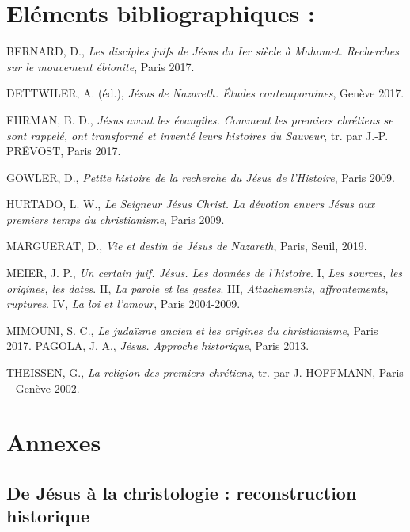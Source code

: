 
\section{Eléments bibliographiques :}

BERNARD, D., \emph{Les disciples juifs de Jésus du Ier siècle à Mahomet.
Recherches sur le mouvement ébionite}, Paris 2017.

DETTWILER, A. (éd.), \emph{Jésus de Nazareth. Études contemporaines},
Genève 2017.

EHRMAN, B. D., \emph{Jésus avant les évangiles. Comment les premiers
chrétiens se sont rappelé, ont transformé et inventé leurs histoires du
Sauveur}, tr. par J.-P. PRÊVOST, Paris 2017.

GOWLER, D., \emph{Petite histoire de la recherche du Jésus de
l'Histoire}, Paris 2009.

HURTADO, L. W., \emph{Le Seigneur Jésus Christ. La dévotion envers Jésus
aux premiers temps du christianisme}, Paris 2009.

MARGUERAT, D., \emph{Vie et destin de Jésus de Nazareth}, Paris, Seuil,
2019.

MEIER, J. P., \emph{Un certain juif. Jésus. Les données de l'histoire}.
I, \emph{Les sources, les origines, les dates}. II, \emph{La parole et
les gestes}. III, \emph{Attachements, affrontements, ruptures}. IV,
\emph{La loi et l'amour}, Paris 2004-2009.

MIMOUNI, S. C., \emph{Le judaïsme ancien et les origines du
christianisme}, Paris 2017. PAGOLA, J. A., \emph{Jésus. Approche
historique}, Paris 2013.

THEISSEN, G., \emph{La religion des premiers chrétiens}, tr. par J.
HOFFMANN, Paris -- Genève 2002.

 
 


\section{Annexes}

\subsection{De Jésus à la christologie : reconstruction historique}
 
